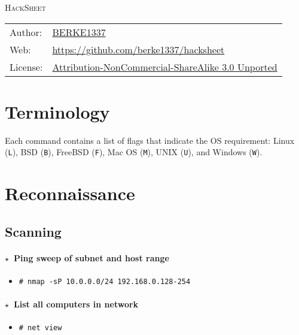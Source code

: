 \documentclass[10pt,landscape]{article}
\newcommand{\os}[1]{\texttt{\footnotesize{#1}}}
\newcommand{\freebsd}{\os{F}}
\newcommand{\bsd}{\os{B}}
\newcommand{\unix}{\os{U}}
\newcommand{\linux}{\os{L}}
\newcommand{\macos}{\os{M}}
\newcommand{\windows}{\os{W}}
\newenvironment{action}[1]
  {\paragraph{$\star$~#1}\begin{itemize}[leftmargin=1cm]}
  {\end{itemize}}
\newcommand{\cmd}[2]{\item[#1] {\small\tt\# #2}}
\begin{document}
\begin{multicols*}{3}

{\Huge\scshape
HackSheet\hspace{-2pt}\hspace{-4pt}
}


{\scriptsize
{}
\begin{tabular}{l l}
Author: & \href{https://github.com/berke1337}{BERKE1337}\\
Web: & \url{https://github.com/berke1337/hacksheet}\\
License: & \href{http://creativecommons.org/licenses/by-nc-sa/3.0/}
                {Attribution-NonCommercial-ShareAlike 3.0 Unported}
\end{tabular}
}


\vspace{-10pt}

\section*{Terminology}

Each command contains a list of flags that indicate the OS requirement: Linux
(\linux), BSD (\bsd), FreeBSD (\freebsd), Mac OS (\macos), UNIX (\unix), and
Windows (\windows).

\section*{Reconnaissance}

\subsection*{Scanning}

\begin{action}{Ping sweep of subnet and host range}
\cmd{\unix}{nmap -sP 10.0.0.0/24 192.168.0.128-254}
\end{action}

\begin{action}{List all computers in network}
\cmd{\windows}{net view}
\end{action}


\end{multicols*}
\end{document}
